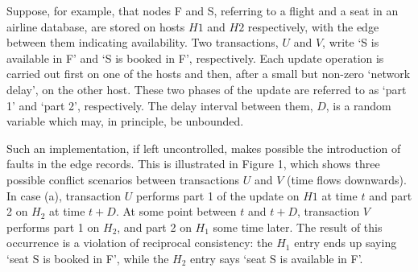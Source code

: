 \documentclass[runningheads]{llncs}
\begin{document}
Suppose, for example, that nodes F and S, referring to a flight and a
seat in an airline database, are stored on hosts $H1$ and $H2$ respectively,
with the edge between them indicating availability. Two transactions, $U$
and $V$, write `S is available in F' and `S is booked in F', respectively.
Each update operation is carried out first on one of the hosts and then,
after a small but non-zero `network delay', on the other host. These two
phases of the update are referred to as `part 1' and `part 2', respectively.
The delay interval between them, $D$, is a random variable which may, in
principle, be unbounded.

Such an implementation, if left uncontrolled, makes possible the
introduction of faults in the edge records. This is illustrated in
Figure 1, which shows three possible conflict scenarios between
transactions $U$ and $V$ (time flows downwards). In case (a),
transaction $U$ performs part 1 of the update on $H1$ at time $t$
and part 2 on $H_2$ at time $t+D$. At some point between $t$
and $t+D$, transaction $V$ performs part 1 on $H_2$, and part 2
on $H_1$ some time later. The result of this occurrence is a
violation of reciprocal consistency: the $H_1$ entry ends up
saying `seat S is booked in F', while the $H_2$ entry says
`seat S is available in F'.
\end{document}
